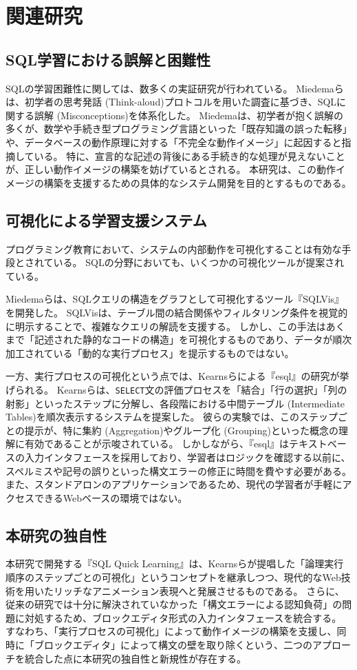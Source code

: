 \documentclass[uplatex,a4paper,12pt]{ujreport}
\begin{document}
\section{関連研究}
\subsection{SQL学習における誤解と困難性}
SQLの学習困難性に関しては、数多くの実証研究が行われている。
Miedemaら\cite{on-learning-sql}は、初学者の思考発話 (Think-aloud)プロトコルを用いた調査に基づき、SQLに関する誤解 (Misconceptions)を体系化した。
Miedemaは、初学者が抱く誤解の多くが、数学や手続き型プログラミング言語といった「既存知識の誤った転移」や、データベースの動作原理に対する「不完全な動作イメージ」に起因すると指摘している。
特に、宣言的な記述の背後にある手続き的な処理が見えないことが、正しい動作イメージの構築を妨げているとされる。
本研究は、この動作イメージの構築を支援するための具体的なシステム開発を目的とするものである。
\subsection{可視化による学習支援システム}
プログラミング教育において、システムの内部動作を可視化することは有効な手段とされている。
SQLの分野においても、いくつかの可視化ツールが提案されている。
\par
Miedemaらは、SQLクエリの構造をグラフとして可視化するツール『SQLVis』を開発した\cite{on-learning-sql}。
SQLVisは、テーブル間の結合関係やフィルタリング条件を視覚的に明示することで、複雑なクエリの解読を支援する。
しかし、この手法はあくまで「記述された静的なコードの構造」を可視化するものであり、データが順次加工されている「動的な実行プロセス」を提示するものではない。
\par
一方、実行プロセスの可視化という点では、Kearnsらによる『esql』の研究\cite{teaching-system-for-sql}が挙げられる。
Kearnsらは、\texttt{SELECT}文の評価プロセスを「結合」「行の選択」「列の射影」といったステップに分解し、各段階における中間テーブル (Intermediate Tables)を順次表示するシステムを提案した。
彼らの実験では、このステップごとの提示が、特に集約 (Aggregation)やグループ化 (Grouping)といった概念の理解に有効であることが示唆されている。
しかしながら、『esql』はテキストベースの入力インタフェースを採用しており、学習者はロジックを確認する以前に、スペルミスや記号の誤りといった構文エラーの修正に時間を費やす必要がある。
また、スタンドアロンのアプリケーションであるため、現代の学習者が手軽にアクセスできるWebベースの環境ではない。
\subsection{本研究の独自性}
本研究で開発する『SQL Quick Learning』は、Kearnsらが提唱した「論理実行順序のステップごとの可視化」というコンセプトを継承しつつ、現代的なWeb技術を用いたリッチなアニメーション表現へと発展させるものである。
さらに、従来の研究では十分に解決されていなかった「構文エラーによる認知負荷」の問題に対処するため、ブロックエディタ形式の入力インタフェースを統合する。
すなわち、「実行プロセスの可視化」によって動作イメージの構築を支援し、同時に「ブロックエディタ」によって構文の壁を取り除くという、二つのアプローチを統合した点に本研究の独自性と新規性が存在する。
\end{document}
